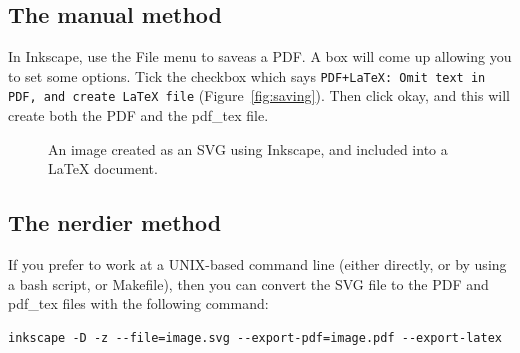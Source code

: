 \documentclass[]{article}
\begin{document}
\subsection{The manual method}

In Inkscape, use the File menu to saveas a PDF. A box will come up allowing you to set some options. Tick the checkbox which says \texttt{PDF+LaTeX: Omit text in PDF, and create LaTeX file} (Figure~\ref{fig:saving}). Then click okay, and this will create both the PDF and the pdf\_tex file.

\begin{figure}
    \centering
    \resizebox{\columnwidth}{!}{}
    \caption{An image created as an SVG using Inkscape, and included into a LaTeX document.}
    \label{fig:inkscape}
\end{figure}

\subsection{The nerdier method}

If you prefer to work at a UNIX-based command line (either directly, or by using a bash script, or Makefile), then you can convert the SVG file to the PDF and pdf\_tex files with the following command:

\begin{verbatim}
inkscape -D -z --file=image.svg --export-pdf=image.pdf --export-latex
\end{verbatim}
\end{document}
